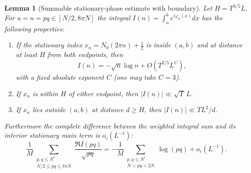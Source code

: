 \documentclass[11pt,reqno]{amsart}
\numberwithin{equation}{section}
\newtheorem{lemma}[theorem]{Lemma}
\newcommand{\N}{\mathbb N}
\begin{document}
\begin{lemma}[Summable stationary-phase estimate with boundary]
\label{lem:C1boundary}
Let $H=T^{3/5}L$. For $u=n=pq\in[N/2,8\pi N]$ the integral
$I(n)=\int_a^b e^{i\varphi_n(x)}dx$ has the following properties:
\begin{enumerate}[label=(\roman*)]
\item If the stationary index
$x_n=N_0(2\pi n)+\tfrac12$ is inside $(a,b)$ and at distance
at least $H$ from both endpoints, then
\begin{equation}\label{eq:C1stationary}
I(n)=-\sqrt n\log n+O(T^{2/5}L^C),
\end{equation}
with a fixed absolute exponent $C$ (one may take $C=3$).
\item If $x_n$ is within $H$ of either endpoint, then
$|I(n)|\ll\sqrt T\,L$.
\item If $x_n$ lies outside $(a,b)$ at distance $d\ge H$, then
$|I(n)|\ll TL^2/d$.
\end{enumerate}
Furthermore the complete difference between the weighted integral
sum and its interior stationary main term is $o_c(L^{-1})$:
\begin{equation}\label{eq:C1summed}
\frac1M\sum_{\substack{p,q\le N^c\\N/2\le pq\le 8\pi N}}
\frac{\Re I(pq)}{\sqrt{pq}}
=-\frac1M\sum_{\substack{p,q\le N^c\\N<pq<2N}}
\log(pq)+o_c(L^{-1}).
\end{equation}
\end{lemma}
\end{document}

